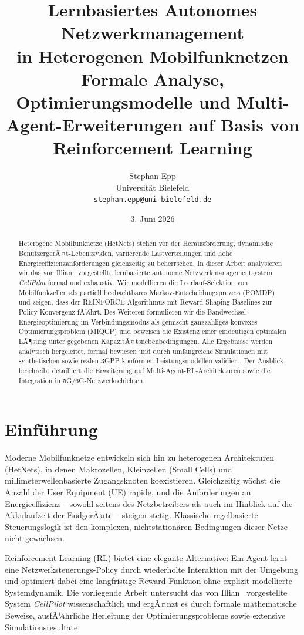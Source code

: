 ﻿\documentclass[a4paper,12pt]{article}
\title{\textbf{Lernbasiertes Autonomes Netzwerkmanagement\\
in Heterogenen Mobilfunknetzen}\\[0.5em]
\large Formale Analyse, Optimierungsmodelle und Multi-Agent-Erweiterungen
auf Basis von Reinforcement Learning}
\author{Stephan Epp\\
\small Universit\"at Bielefeld\\
\small \texttt{stephan.epp@uni-bielefeld.de}}
\date{3. Juni 2026}
\theoremstyle{definition}
\begin{document}
\maketitle

\begin{abstract}
Heterogene Mobilfunknetze (HetNets) stehen vor der Herausforderung, dynamische
BenutzergerÃ¤t-Lebenszyklen, variierende Lastverteilungen und hohe Energieeffizienzanforderungen
gleichzeitig zu beherrschen. In dieser Arbeit analysieren wir das von Illian~\cite{illian2026}
vorgestellte lernbasierte autonome Netzwerkmanagementsystem \emph{CellPilot} formal und
exhaustiv. Wir modellieren die Leerlauf-Selektion von Mobilfunkzellen als partiell
beobachtbares Markov-Entscheidungsprozess (POMDP) und zeigen, dass der REINFORCE-Algorithmus
mit Reward-Shaping-Baselines zur Policy-Konvergenz fÃ¼hrt. Des Weiteren formulieren wir die
Bandwechsel-Energieoptimierung im Verbindungsmodus als gemischt-ganzzahliges konvexes
Optimierungsproblem (MIQCP) und beweisen die Existenz einer eindeutigen optimalen LÃ¶sung
unter gegebenen KapazitÃ¤tsnebenbedingungen. Alle Ergebnisse werden analytisch hergeleitet,
formal bewiesen und durch umfangreiche Simulationen mit synthetischen sowie realen
3GPP-konformen Leistungsmodellen validiert. Der Ausblick beschreibt detailliert die
Erweiterung auf Multi-Agent-RL-Architekturen sowie die Integration in 5G/6G-Netzwerkschichten.
\end{abstract}

\tableofcontents
\newpage

\section{Einf\"uhrung}

Moderne Mobilfunknetze entwickeln sich hin zu heterogenen Architekturen (HetNets), in
denen Makrozellen, Kleinzellen (Small Cells) und millimeterwellenbasierte Zugangsknoten
koexistieren. Gleichzeitig w\"achst die Anzahl der User Equipment (UE) rapide, und die
Anforderungen an Energieeffizienz -- sowohl seitens des Netzbetreibers als auch im Hinblick
auf die Akkulaufzeit der EndgerÃ¤te -- steigen stetig. Klassische regelbasierte Steuerungslogik
ist den komplexen, nichtstation\"aren Bedingungen dieser Netze nicht gewachsen.

Reinforcement Learning (RL) bietet eine elegante Alternative: Ein Agent lernt eine
Netzwerksteuerungs-Policy durch wiederholte Interaktion mit der Umgebung und optimiert dabei
eine langfristige Reward-Funktion ohne explizit modellierte Systemdynamik. Die vorliegende
Arbeit untersucht das von Illian~\cite{illian2026} vorgestellte System \emph{CellPilot}
wissenschaftlich und ergÃ¤nzt es durch formale mathematische Beweise, ausfÃ¼hrliche
Herleitung der Optimierungsprobleme sowie extensive Simulationsresultate.
\end{document}
